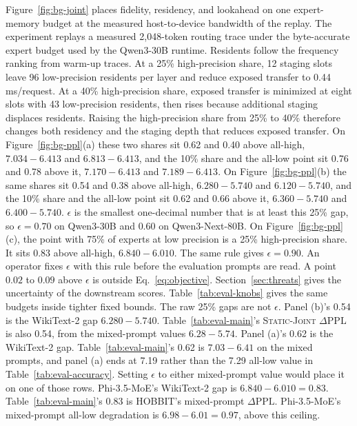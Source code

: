 Figure~\ref{fig:bg-joint} places fidelity, residency, and lookahead on one expert-memory budget at the measured host-to-device bandwidth of the replay.
The experiment replays a measured 2,048-token routing trace under the byte-accurate expert budget used by the Qwen3-30B runtime.
Residents follow the frequency ranking from warm-up traces.
At a 25\% high-precision share, 12 staging slots leave 96 low-precision residents per layer and reduce exposed transfer to 0.44\,ms/request.
At a 40\% high-precision share, exposed transfer is minimized at eight slots with 43 low-precision residents, then rises because additional staging displaces residents.
Raising the high-precision share from 25\% to 40\% therefore changes both residency and the staging depth that reduces exposed transfer.
On Figure~\ref{fig:bg-ppl}(a) these two shares sit 0.62 and 0.40 above all-high, \(7.034-6.413\) and \(6.813-6.413\), and the 10\% share and the all-low point sit 0.76 and 0.78 above it, \(7.170-6.413\) and \(7.189-6.413\).
On Figure~\ref{fig:bg-ppl}(b) the same shares sit 0.54 and 0.38 above all-high, \(6.280-5.740\) and \(6.120-5.740\), and the 10\% share and the all-low point sit 0.62 and 0.66 above it, \(6.360-5.740\) and \(6.400-5.740\).
\(\epsilon\) is the smallest one-decimal number that is at least this 25\% gap, so \(\epsilon=0.70\) on Qwen3-30B and \(0.60\) on Qwen3-Next-80B.
On Figure~\ref{fig:bg-ppl}(c), the point with 75\% of experts at low precision is a 25\% high-precision share. It sits 0.83 above all-high, \(6.840-6.010\). The same rule gives \(\epsilon=0.90\). An operator fixes \(\epsilon\) with this rule before the evaluation prompts are read. A point \(0.02\) to \(0.09\) above \(\epsilon\) is outside Eq.~\eqref{eq:objective}. Section~\ref{sec:threats} gives the uncertainty of the downstream scores. Table~\ref{tab:eval-knobs} gives the same budgets inside tighter fixed bounds.
The raw 25\% gaps are not \(\epsilon\). Panel (b)'s 0.54 is the WikiText-2 gap \(6.280-5.740\). Table~\ref{tab:eval-main}'s \textsc{Static-Joint} \(\Delta\mathrm{PPL}\) is also 0.54, from the mixed-prompt values \(6.28-5.74\). Panel (a)'s 0.62 is the WikiText-2 gap. Table~\ref{tab:eval-main}'s 0.62 is \(7.03-6.41\) on the mixed prompts, and panel (a) ends at 7.19 rather than the 7.29 all-low value in Table~\ref{tab:eval-accuracy}. Setting \(\epsilon\) to either mixed-prompt value would place it on one of those rows. Phi-3.5-MoE's WikiText-2 gap is \(6.840-6.010=0.83\). Table~\ref{tab:eval-main}'s 0.83 is HOBBIT's mixed-prompt \(\Delta\mathrm{PPL}\). Phi-3.5-MoE's mixed-prompt all-low degradation is \(6.98-6.01=0.97\), above this ceiling.

